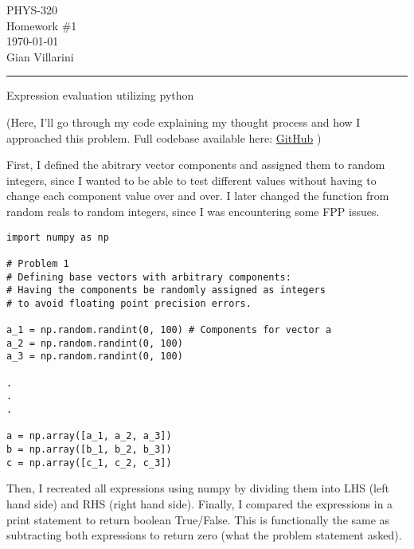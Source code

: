 \documentclass[12pt,letterpaper, onecolumn]{exam}
\begin{document}
\pagestyle{fancy}
\fancyhead{} %

\begingroup  
    \centering
    \LARGE PHYS-320\\
    \LARGE Homework \#1\\[0.5em]
    \large \today\\[0.5em]
    \large Gian Villarini\par

\endgroup
\rule{\textwidth}{0.4pt}
\pointsdroppedatright   %
\printanswers
\renewcommand{\solutiontitle}{\noindent\textbf{Ans:}\enspace}   %

\begin{questions}

    \question[Part A] Expression evaluation utilizing python\droppoints
    
    \begin{solution}
    (Here, I'll go through my code explaining my thought process and how I approached this problem. Full codebase available here: \href{https://github.com/zaesho/PHYS.320-Math-Methods}{GitHub} )

    First, I defined the abitrary vector components and assigned them to random integers, since I wanted to be able to test different values without having to change each component value over and over. I later changed the function from random reals to random integers, since I was encountering some FPP issues.
            \begin{lstlisting}   
import numpy as np

# Problem 1
# Defining base vectors with arbitrary components:
# Having the components be randomly assigned as integers
# to avoid floating point precision errors.

a_1 = np.random.randint(0, 100) # Components for vector a
a_2 = np.random.randint(0, 100)
a_3 = np.random.randint(0, 100)

.
.
.

a = np.array([a_1, a_2, a_3])
b = np.array([b_1, b_2, b_3])
c = np.array([c_1, c_2, c_3])

            \end{lstlisting}
        Then, I recreated all expressions using numpy by dividing them into LHS (left hand side) and RHS (right hand side). Finally, I compared the expressions in a print statement to return boolean True/False. This is functionally the same as subtracting both expressions to return zero (what the problem statement asked).


\end{solution}
\end{questions}
\end{document}
